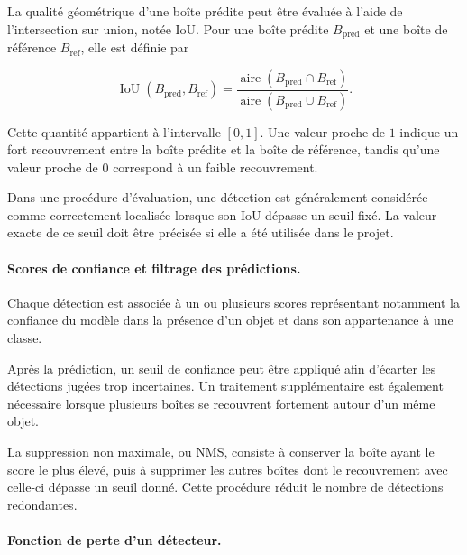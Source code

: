 \documentclass[11pt,a4paper]{report}
\begin{document}
La qualité géométrique d'une boîte prédite peut être évaluée à l'aide de
l'intersection sur union, notée IoU. Pour une boîte prédite
$B_{\mathrm{pred}}$ et une boîte de référence $B_{\mathrm{ref}}$, elle est
définie par

\begin{equation}
    \operatorname{IoU}
    \left(
        B_{\mathrm{pred}},
        B_{\mathrm{ref}}
    \right)
    =
    \frac{
        \operatorname{aire}
        \left(
            B_{\mathrm{pred}}
            \cap
            B_{\mathrm{ref}}
        \right)
    }{
        \operatorname{aire}
        \left(
            B_{\mathrm{pred}}
            \cup
            B_{\mathrm{ref}}
        \right)
    }.
    \label{eq:iou}
\end{equation}

Cette quantité appartient à l'intervalle $[0,1]$. Une valeur proche de $1$
indique un fort recouvrement entre la boîte prédite et la boîte de référence,
tandis qu'une valeur proche de $0$ correspond à un faible recouvrement.

Dans une procédure d'évaluation, une détection est généralement considérée
comme correctement localisée lorsque son IoU dépasse un seuil fixé. La valeur
exacte de ce seuil doit être précisée si elle a été utilisée dans le projet.

\paragraph{Scores de confiance et filtrage des prédictions.}

Chaque détection est associée à un ou plusieurs scores représentant notamment
la confiance du modèle dans la présence d'un objet et dans son appartenance à
une classe.

Après la prédiction, un seuil de confiance peut être appliqué afin d'écarter les
détections jugées trop incertaines. Un traitement supplémentaire est également
nécessaire lorsque plusieurs boîtes se recouvrent fortement autour d'un même
objet.

La suppression non maximale, ou NMS, consiste à conserver la boîte ayant le
score le plus élevé, puis à supprimer les autres boîtes dont le recouvrement
avec celle-ci dépasse un seuil donné. Cette procédure réduit le nombre de
détections redondantes.

\paragraph{Fonction de perte d'un détecteur.}
\end{document}
